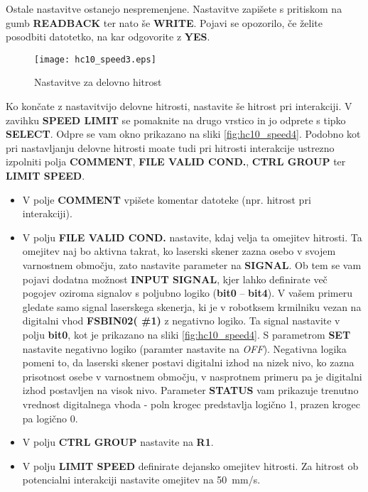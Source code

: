 Ostale nastavitve ostanejo nespremenjene. Nastavitve zapišete s pritiskom na gumb \textbf{READBACK} ter nato še \textbf{WRITE}. Pojavi se opozorilo, če želite posodbiti datotetko, na kar odgovorite z \textbf{YES}.

\begin{figure}[!hbt]
	\centering
	\texttt{[image: hc10\_speed3.eps]}
	\caption{Nastavitve za delovno hitrost}
	\label{fig:hc10_speed3}
\end{figure}

Ko končate z nastavitvijo delovne hitrosti, nastavite še hitrost pri interakciji. V zavihku \textbf{SPEED LIMIT} se pomaknite na drugo vrstico in jo odprete s tipko \textbf{SELECT}. Odpre se vam okno prikazano na sliki \ref{fig:hc10_speed4}. Podobno kot pri nastavljanju delovne hitrosti moate tudi pri hitrosti interakcije ustrezno izpolniti polja \textbf{COMMENT}, \textbf{FILE VALID COND.}, \textbf{CTRL GROUP} ter \textbf{LIMIT SPEED}.

\begin{itemize}
	\item V polje \textbf{COMMENT} vpišete komentar datoteke (npr. hitrost pri interakciji).
	\item V polju \textbf{FILE VALID COND.} nastavite, kdaj velja ta omejitev hitrosti. Ta  omejitev naj bo aktivna takrat, ko laserski skener zazna osebo v svojem varnostnem območju, zato nastavite parameter na \textbf{SIGNAL}. Ob tem se vam pojavi dodatna možnost \textbf{INPUT SIGNAL}, kjer lahko definirate več pogojev oziroma signalov s poljubno logiko (\textbf{bit0} -- \textbf{bit4}). V vašem primeru gledate samo signal laserskega skenerja, ki je v robotksem krmilniku vezan na digitalni vhod  \textbf{FSBIN02( \#1)} z negativno logiko. Ta signal nastavite v polju \textbf{bit0}, kot je prikazano na sliki \ref{fig:hc10_speed4}. S parametrom \textbf{SET} nastavite negativno logiko (paramter nastavite na \emph{OFF}). Negativna logika pomeni to, da laserski skener postavi digitalni izhod na nizek nivo, ko zazna prisotnost osebe v varnostnem območju, v nasprotnem primeru pa je digitalni izhod postavljen na visok nivo. Parameter \textbf{STATUS} vam prikazuje trenutno vrednost digitalnega vhoda - poln krogec predstavlja logično 1, prazen krogec pa logično 0.
	\item V polju \textbf{CTRL GROUP} nastavite na \textbf{R1}.
	\item V polju \textbf{LIMIT SPEED} definirate dejansko omejitev hitrosti. Za hitrost ob potencialni interakciji nastavite omejitev na 50~mm/s.
\end{itemize}

